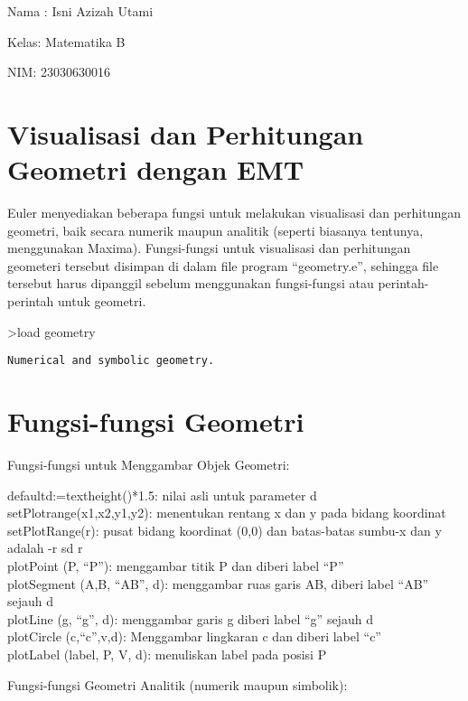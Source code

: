 \documentclass[
]{book}
\author{}
\date{}
\begin{document}
\frontmatter

\mainmatter
Nama : Isni Azizah Utami

Kelas: Matematika B

NIM: 23030630016

\chapter{Visualisasi dan Perhitungan Geometri dengan EMT}\label{visualisasi-dan-perhitungan-geometri-dengan-emt}

Euler menyediakan beberapa fungsi untuk melakukan visualisasi dan perhitungan geometri, baik secara numerik maupun analitik (seperti biasanya tentunya, menggunakan Maxima). Fungsi-fungsi untuk visualisasi dan perhitungan geometeri tersebut disimpan di dalam file program ``geometry.e'', sehingga file tersebut harus dipanggil sebelum menggunakan fungsi-fungsi atau perintah-perintah untuk geometri.

\textgreater load geometry

\begin{verbatim}
Numerical and symbolic geometry.
\end{verbatim}

\chapter{Fungsi-fungsi Geometri}\label{fungsi-fungsi-geometri}

Fungsi-fungsi untuk Menggambar Objek Geometri:

defaultd:=textheight()*1.5: nilai asli untuk parameter d\\
setPlotrange(x1,x2,y1,y2): menentukan rentang x dan y pada bidang koordinat\\
setPlotRange(r): pusat bidang koordinat (0,0) dan batas-batas sumbu-x dan y adalah -r sd r\\
plotPoint (P, ``P''): menggambar titik P dan diberi label ``P''\\
plotSegment (A,B, ``AB'', d): menggambar ruas garis AB, diberi label ``AB'' sejauh d\\
plotLine (g, ``g'', d): menggambar garis g diberi label ``g'' sejauh d\\
plotCircle (c,``c'',v,d): Menggambar lingkaran c dan diberi label ``c''\\
plotLabel (label, P, V, d): menuliskan label pada posisi P

Fungsi-fungsi Geometri Analitik (numerik maupun simbolik):
\end{document}
